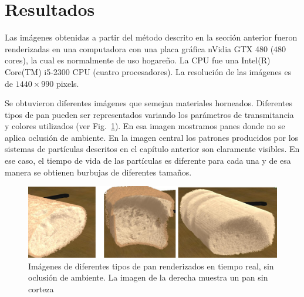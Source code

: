 
\section{Resultados}
Las imágenes obtenidas a partir del método descrito en la sección anterior fueron renderizadas en una computadora con una placa gráfica nVidia GTX 480 ($480$ cores), la cual es normalmente de uso hogareño.
La CPU fue una Intel(R) Core(TM) i5-2300 CPU (cuatro procesadores).
La resolución de las imágenes es de $1440\times990$ pixels. 

Se obtuvieron diferentes imágenes que semejan materiales horneados.
Diferentes tipos de pan pueden ser representados variando los parámetros de transmitancia y colores utilizados (ver Fig.~\ref{fg:breadsnooc}).
En esa imagen mostramos panes donde no se aplica oclusión de ambiente.
En la imagen central los patrones producidos por los sistemas de partículas descritos en el capítulo anterior son claramente visibles.
En ese caso, el tiempo de vida de las partículas es diferente para cada una y de esa manera se obtienen burbujas de diferentes tamaños.

\begin{figure}[htb!]
  \centerline{\includegraphics[width=13cm]{fig5}}
  \caption[Imágenes de diferentes tipos de pan renderizados en tiempo real, sin oclusión de ambiente]{Imágenes de diferentes tipos de pan renderizados en tiempo real, sin oclusión de ambiente. La imagen de la derecha muestra un pan sin corteza}
  \label{fg:breadsnooc}
\end{figure}

